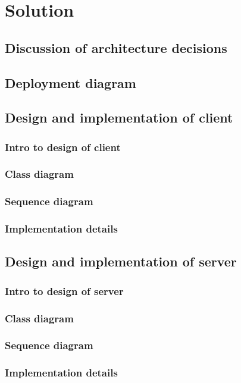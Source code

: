 \chapter{Solution}

\section{Discussion of architecture decisions}

\section{Deployment diagram}

\section{Design and implementation of client}

\subsection{Intro to design of client}

\subsection{Class diagram}

\subsection{Sequence diagram}

\subsection{Implementation details}


\section{Design and implementation of server}

\subsection{Intro to design of server}

\subsection{Class diagram}

\subsection{Sequence diagram}

\subsection{Implementation details}